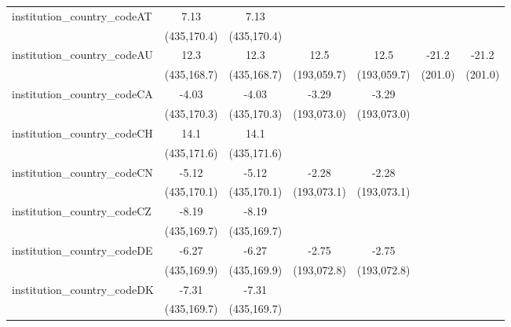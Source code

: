 \begin{tabular}{lcccccc}
   institution\_country\_codeAT          & 7.13          & 7.13          &               &               &             &   \\   
                                         & (435,170.4)   & (435,170.4)   &               &               &             &   \\   
   institution\_country\_codeAU          & 12.3          & 12.3          & 12.5          & 12.5          & -21.2       & -21.2\\   
                                         & (435,168.7)   & (435,168.7)   & (193,059.7)   & (193,059.7)   & (201.0)     & (201.0)\\   
   institution\_country\_codeCA          & -4.03         & -4.03         & -3.29         & -3.29         &             &   \\   
                                         & (435,170.3)   & (435,170.3)   & (193,073.0)   & (193,073.0)   &             &   \\   
   institution\_country\_codeCH          & 14.1          & 14.1          &               &               &             &   \\   
                                         & (435,171.6)   & (435,171.6)   &               &               &             &   \\   
   institution\_country\_codeCN          & -5.12         & -5.12         & -2.28         & -2.28         &             &   \\   
                                         & (435,170.1)   & (435,170.1)   & (193,073.1)   & (193,073.1)   &             &   \\   
   institution\_country\_codeCZ          & -8.19         & -8.19         &               &               &             &   \\   
                                         & (435,169.7)   & (435,169.7)   &               &               &             &   \\   
   institution\_country\_codeDE          & -6.27         & -6.27         & -2.75         & -2.75         &             &   \\   
                                         & (435,169.9)   & (435,169.9)   & (193,072.8)   & (193,072.8)   &             &   \\   
   institution\_country\_codeDK          & -7.31         & -7.31         &               &               &             &   \\   
                                         & (435,169.7)   & (435,169.7)   &               &               &             &   \\   

\end{tabular}
